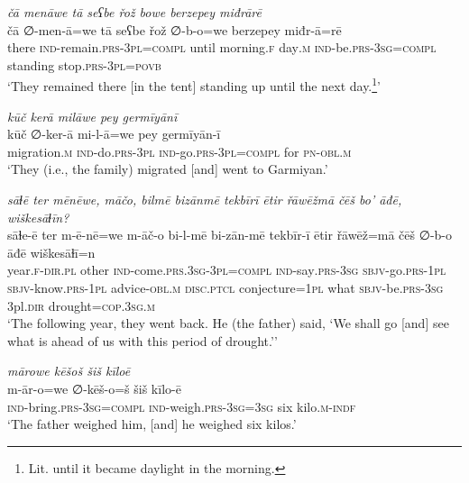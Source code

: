 \ea \label{ZB.26}
\textit{čā menāwe tā seʕbe řož bowe berzepey miđrārē} \\ 
\gll čā ∅-men-ā=we tā seʕbe řož ∅-b-o=we berzepey miđr-ā=rē \\ 
 there \textsc{ind-}remain\textsc{.prs}\textsc{-3pl}\textsc{=compl} until morning\textsc{.f} day\textsc{.m} \textsc{ind-}be\textsc{.prs}\textsc{-3sg}\textsc{=\textsc{compl}} standing stop\textsc{.prs}\textsc{-3pl}\textsc{=\textsc{povb}} \\ 
\glt `They remained there [in the tent] standing up until the next day.\footnote{Lit. until it became daylight in the morning.}'
\z 
 
\ea \label{ZB.39}
\textit{kūč kerā milāwe pey germīyānī} \\ 
\gll kūč ∅-ker-ā mi-l-ā=we pey germīyān-ī \\ 
 migration\textsc{.m} \textsc{ind-}do\textsc{.prs}\textsc{-3pl} \textsc{ind-}go\textsc{.prs}\textsc{-3pl}\textsc{=compl} for \textsc{pn}\textsc{-obl}\textsc{.m} \\ 
\glt `They (i.e., the family) migrated [and] went to Garmiyan.'
\z 
 
\ea \label{ZB.46}
\textit{sāɫē ter mēnēwe, māčo, bilmē bizānmē tekbīrī ētir řāwēžmā čēš bo’ āđē, wiškesāɫīn?} \\ 
\gll sāɫe-ē ter m-ē-nē=we m-āč-o bi-l-mē bi-zān-mē tekbīr-ī ētir řāwēž=mā čēš ∅-b-o āđē wiškesāɫī=n \\ 
 year\textsc{.f}\textsc{-dir}\textsc{.pl} other \textsc{ind-}come\textsc{.prs}\textsc{.3sg}\textsc{-3pl}\textsc{=compl} \textsc{ind-}say\textsc{.prs}\textsc{-3sg} \textsc{sbjv-}go\textsc{.prs}\textsc{-1pl} \textsc{sbjv-}know\textsc{.prs}\textsc{-1pl} advice\textsc{-obl}\textsc{.m} \textsc{disc.ptcl} conjecture\textsc{=1pl} what \textsc{sbjv-}be\textsc{.prs}\textsc{-3sg} 3pl\textsc{.dir} drought\textsc{=cop}\textsc{.3sg}\textsc{.m} \\ 
\glt `The following year, they went back. He (the father) said, ‘We shall go [and] see what is ahead of us with this period of drought.’'
\z 
 
\ea \label{ZB.51}
\textit{mārowe kēšoš šiš kīloē} \\ 
\gll m-ār-o=we ∅-kēš-o=š šiš kīlo-ē \\ 
 \textsc{ind-}bring\textsc{.prs}\textsc{-3sg}\textsc{=compl} \textsc{ind-}weigh\textsc{.prs}\textsc{-3sg}\textsc{=3sg} six kilo\textsc{.m}\textsc{-indf} \\ 
\glt `The father weighed him, [and] he weighed six kilos.'
\z 
 
